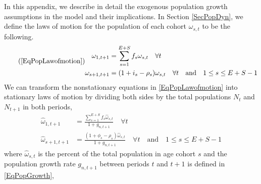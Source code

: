\documentclass[12pt]{report}
\theoremstyle{definition}
\begin{document}
  In this appendix, we describe in detail the exogenous population growth assumptions in the model and their implications. In Section \ref{SecPopDyn}, we define the laws of motion for the population of each cohort $\omega_{s,t}$ to be the following.
  \begin{equation}\tag{\ref{EqPopLawofmotion}}
    \begin{split}
      \omega_{1,t+1} &= \sum_{s=1}^{E+S} f_s\omega_{s,t}\quad\forall t \\
        \omega_{s+1,t+1} &= (1 + i_s - \rho_s)\omega_{s,t}\quad\forall t\quad\text{and}\quad 1\leq s \leq E+S-1
    \end{split}
  \end{equation}
  We can transform the nonstationary equations in \eqref{EqPopLawofmotion} into stationary laws of motion by dividing both sides by the total populations $N_t$ and $N_{t+1}$ in both periods,
  \begin{equation}\label{EqPopLawofmotionStat}
    \begin{split}
      \hat{\omega}_{1,t+1} &= \frac{\sum_{s=1}^{E+S} f_s\hat{\omega}_{s,t}}{1+g_{n,t+1}}\quad\forall t \\
      \hat{\omega}_{s+1,t+1} &= \frac{(1 + \phi_s - \rho_s)\hat{\omega}_{s,t}}{1+g_{n,t+1}}\quad\forall t\quad\text{and}\quad 1\leq s \leq E+S-1
    \end{split}
  \end{equation}
  where $\hat{\omega}_{s,t}$ is the percent of the total population in age cohort $s$ and the population growth rate $g_{n,t+1}$ between periods $t$ and $t+1$ is defined in \eqref{EqPopGrowth},
\end{document}
